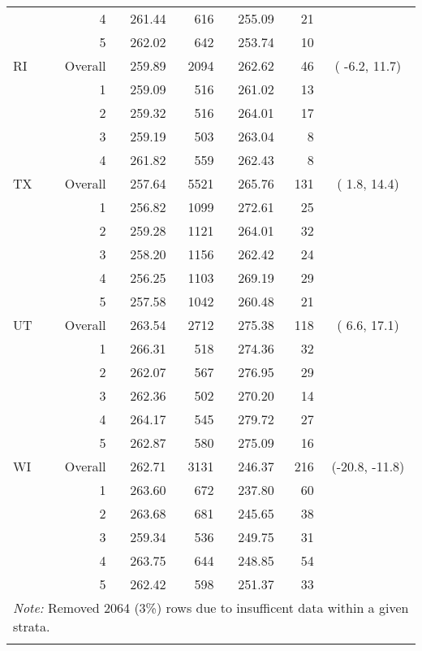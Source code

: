 \begin{longtable}{lrrr@{\extracolsep{.25cm}}rrc}
   & 4 & 261.44 & 616 & 255.09 &  21 &  \\ 
   & 5 & 262.02 & 642 & 253.74 &  10 &  \\ 
   \hline
RI & Overall & 259.89 & 2094 & 262.62 &  46 & ( -6.2,  11.7) \\ 
   & 1 & 259.09 & 516 & 261.02 &  13 &  \\ 
   & 2 & 259.32 & 516 & 264.01 &  17 &  \\ 
   & 3 & 259.19 & 503 & 263.04 &   8 &  \\ 
   & 4 & 261.82 & 559 & 262.43 &   8 &  \\ 
   \hline
TX & Overall & 257.64 & 5521 & 265.76 & 131 & (  1.8,  14.4) \\ 
   & 1 & 256.82 & 1099 & 272.61 &  25 &  \\ 
   & 2 & 259.28 & 1121 & 264.01 &  32 &  \\ 
   & 3 & 258.20 & 1156 & 262.42 &  24 &  \\ 
   & 4 & 256.25 & 1103 & 269.19 &  29 &  \\ 
   & 5 & 257.58 & 1042 & 260.48 &  21 &  \\ 
   \hline
UT & Overall & 263.54 & 2712 & 275.38 & 118 & (  6.6,  17.1) \\ 
   & 1 & 266.31 & 518 & 274.36 &  32 &  \\ 
   & 2 & 262.07 & 567 & 276.95 &  29 &  \\ 
   & 3 & 262.36 & 502 & 270.20 &  14 &  \\ 
   & 4 & 264.17 & 545 & 279.72 &  27 &  \\ 
   & 5 & 262.87 & 580 & 275.09 &  16 &  \\ 
   \hline
WI & Overall & 262.71 & 3131 & 246.37 & 216 & (-20.8, -11.8) \\ 
   & 1 & 263.60 & 672 & 237.80 &  60 &  \\ 
   & 2 & 263.68 & 681 & 245.65 &  38 &  \\ 
   & 3 & 259.34 & 536 & 249.75 &  31 &  \\ 
   & 4 & 263.75 & 644 & 248.85 &  54 &  \\ 
   & 5 & 262.42 & 598 & 251.37 &  33 &  \\ 
   \hline \multicolumn{7}{l}{\textit{Note:} Removed 2064 (3\%) rows due to insufficent data within a given strata.} \\\hline
\label{g8read-mlpsa-lrAIC}
\end{longtable}
